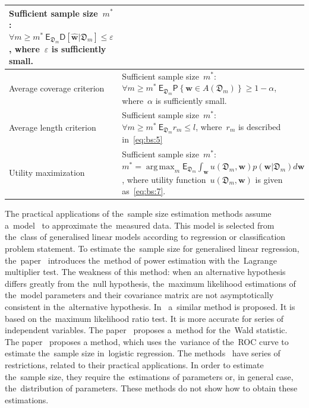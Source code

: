 \documentclass[
11pt,%
tightenlines,%
twoside,%
onecolumn,%
nofloats,%
nobibnotes,%
nofootinbib,%
superscriptaddress,%
noshowpacs,%
centertags]%
{revtex4}
\DeclareMathOperator*{\argmax}{arg\,max}
\begin{document}
\begin{table}
\begin{center}
\begin{tabular}{p{}|p{}|p{}}
    Sufficient sample size~$m^*$:  $\forall m \geq m^* ~ \mathsf{E}_{\mathfrak{D}_m}\mathsf{D}\left[\hat{\mathbf{w}}|\mathfrak{D}_m\right] \leq \varepsilon$, where~$\varepsilon$ is sufficiently small.
    &\cite{joseph1995, joseph1997}\\
\hline
    Average coverage criterion &
    Sufficient sample size~$m^*$:    $\forall m \geq m^* ~ \mathsf{E}_{\mathfrak{D}_m}\mathsf{P}\left\{\mathbf{w} \in A\left(\mathfrak{D}_m\right)\right\} \geq 1-\alpha$, where~$\alpha$ is sufficiently small.
    &\cite{joseph1995, joseph1997}\\
\hline
    Average length criterion &
    Sufficient sample size~$m^*$:    $\forall m \geq m^* ~ \mathsf{E}_{\mathfrak{D}_m}r_m\leq l$,  where~$r_m$ is described in~\eqref{eq:bs:5}
    &\cite{joseph1995, joseph1997}\\
\hline
    Utility maximization &
    Sufficient sample size~$m^*$: $m^* = \argmax_{m} \mathsf{E}_{\mathfrak{D}_m}\int_{\mathbf{w}}u\left(\mathfrak{D}_m, \mathbf{w}\right)p(\mathbf{w}|\mathfrak{D}_m)d\mathbf{w}$, where utility function~$u\left(\mathfrak{D}_m, \mathbf{w}\right)$ is given as~\eqref{eq:bs:7}.
    &\cite{lindley1997}\\
\hline
\end{tabular}
\end{center}
\end{table}

The practical applications of the~sample size estimation methods assume
 a~model~\cite{kloek1975} to approximate the~measured data. This model is selected from the~class of generalised linear
  models according to regression or classification problem statement. To estimate the~sample size for generalised linear regression,
the~paper~\cite{self1988} introduces the~method of power estimation with the~Lagrange multiplier test. The weakness of this method:
when an alternative hypothesis differs greatly from the~null hypothesis, the~maximum likelihood estimations of the~model parameters and their covariance
 matrix are not asymptotically consistent in the~alternative hypothesis. In~\cite{self1992} a~similar method is proposed.
It is based on the~maximum likelihood ratio test. It is more
accurate for series of independent variables. The
paper~\cite{shieh2005} proposes a~method for the~Wald statistic. The
paper~\cite{motrenko2014} proposes a method, which uses the~variance
of the~ROC curve to estimate the~sample size in~logistic regression.
The methods~\cite{self1988, self1992, shieh2000, shieh2005} have
series of restrictions, related to their practical applications. In
order to estimate the~sample size, they require the~estimations of
parameters or, in general case, the~distribution of parameters.
These methods do not show how to obtain these estimations.
\end{document}
